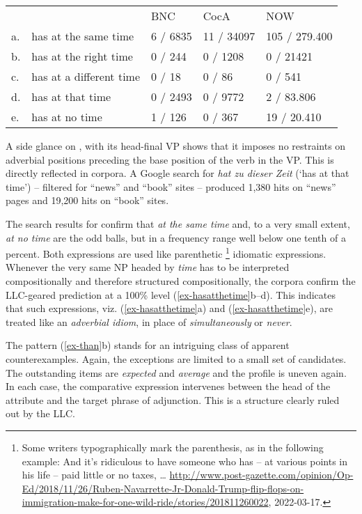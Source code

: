 \documentclass[output=paper
  ,nobabel
  ,uniformtopskip %
]{langscibook}
\begin{document}
\eal\label{ex-hasatthetime}%
\begin{tabular}[t]{lllll}
& & BNC & CocA & NOW \\
a. & has at the same time & 6 / 6835 & 11 / 34097 & 105 / 279.400\\
b. & has at the right time & 0 / 244 & 0 / 1208 & 0 / 21421\\
c. & has at a different time & 0 / 18 & 0 / 86 & 0 / 541\\
d. & has at that time & 0 / 2493 & 0 / 9772 & 2 / 83.806\\
e. & has at no time & 1 / 126 & 0 / 367 & 19 / 20.410
\end{tabular}
\zl

\noindent
A side glance on , with its head-final VP shows that it imposes no restraints on adverbial positions preceding the base position of the verb in the VP. This is directly reflected in corpora. A Google search for \emph{hat zu dieser Zeit} (‘has at that time’) – filtered for ``news'' and ``book'' sites – produced 1,380 hits on ``news'' pages and 19,200 hits on ``book'' sites.

The search results for  confirm that \emph{at the same time} and, to a very small extent, \emph{at no time} are the odd balls, but in a frequency range well below one tenth of a percent. Both expressions are used like parenthetic%
%
\footnote{Some writers typographically mark the parenthesis, as in the following example:
\ea And it's ridiculous to have someone who has – at various points in his life – paid little or no taxes, \ldots
\z
\url{http://www.post-gazette.com/opinion/Op-Ed/2018/11/26/Ruben-Navarrette-Jr-Donald-Trump-flip-flops-on-immigration-make-for-one-wild-ride/stories/201811260022}, 2022-03-17.
}
idiomatic expressions. Whenever the very same NP headed by \emph{time} has to be interpreted compositionally and therefore structured compositionally, the corpora confirm the LLC-geared prediction at a 100\% level (\ref{ex-hasatthetime}b–d). This indicates that such expressions, viz. (\ref{ex-hasatthetime}a) and (\ref{ex-hasatthetime}e), are treated like an \emph{adverbial idiom}, in place of \emph{simultaneously} or \emph{never}.

The pattern (\ref{ex-than}b) stands for an intriguing class of apparent counterexamples. Again, the exceptions are limited to a small set of candidates. The outstanding items are \emph{expected} and \emph{average} and the profile is uneven again. In each case, the comparative expression intervenes between the head of the attribute and the target phrase of adjunction. This is a structure clearly ruled out by the LLC.
\end{document}
